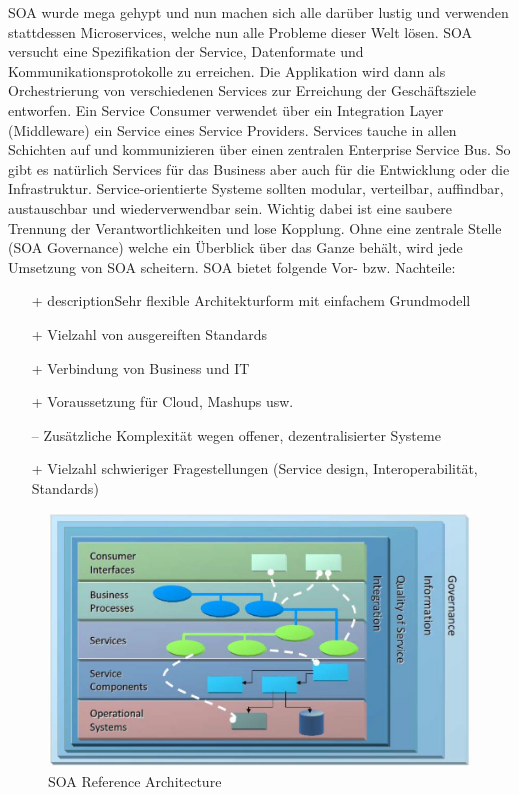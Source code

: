 SOA wurde mega gehypt und nun machen sich alle darüber lustig und verwenden stattdessen Microservices, welche nun alle Probleme dieser Welt lösen. SOA versucht eine Spezifikation der Service, Datenformate und Kommunikationsprotokolle zu erreichen. Die Applikation wird dann als Orchestrierung von verschiedenen Services zur Erreichung der Geschäftsziele entworfen. Ein Service Consumer verwendet über ein Integration Layer (Middleware) ein Service eines Service Providers. Services tauche in allen Schichten auf und kommunizieren über einen zentralen Enterprise Service Bus. So gibt es natürlich Services für das Business aber auch für die Entwicklung oder die Infrastruktur. Service-orientierte Systeme sollten modular, verteilbar, auffindbar, austauschbar und wiederverwendbar sein. Wichtig dabei ist eine saubere Trennung der Verantwortlichkeiten und lose Kopplung. Ohne eine zentrale Stelle (SOA Governance) welche ein Überblick über das Ganze behält, wird jede Umsetzung von SOA scheitern. SOA bietet folgende Vor- bzw. Nachteile:
\begin{itemize}
	\item[+] descriptionSehr flexible Architekturform mit einfachem Grundmodell
	\item[+] Vielzahl von ausgereiften Standards
	\item[+] Verbindung von Business und IT
	\item[+] Voraussetzung für Cloud, Mashups usw.
	\item[--] Zusätzliche Komplexität wegen offener, dezentralisierter Systeme	
	\item[+] Vielzahl schwieriger Fragestellungen (Service design, Interoperabilität, Standards)
\end{itemize}

\begin{figure}[h!]
\centering
\includegraphics[width=0.7\linewidth]{fig/soa-reference-architecture}
\caption{SOA Reference Architecture}
\label{fig:soa-reference-architecture}
\end{figure}


